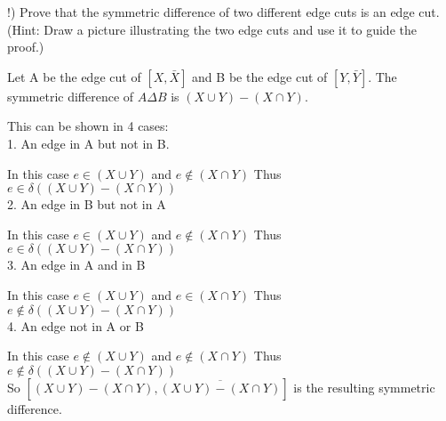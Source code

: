 \documentclass[12pt]{article}
\newenvironment{question}[2][Question]{\begin{trivlist}
\item[\hskip \labelsep {\bfseries #1}\hskip \labelsep {\bfseries #2.}]}{\end{trivlist}}
\begin{document}
\begin{question}{3}

($!$) Prove that the symmetric difference of two different edge cuts is an edge cut. (Hint: Draw a picture illustrating the two edge cuts and use it to guide the proof.)

Let A be the edge cut of  $[X,\bar{X}]$ and B be the edge cut of $[Y,\bar{Y}]$. The symmetric difference of $A \Delta B$ is $(X \cup Y) - (X \cap Y)$. 

This can be shown in 4 cases: \\
1. An edge in A but not in B.

	In this case $e \in (X \cup Y)$ and $e \notin (X \cap Y)$ Thus $e \in \delta((X \cup Y) - (X \cap Y))$\\	
2. An edge in B but not in A

	In this case $e \in (X \cup Y)$ and $e \notin (X \cap Y)$ Thus $e \in \delta((X \cup Y) - (X \cap Y))$\\	
3. An edge in A and in B

	In this case $e \in (X \cup Y)$ and $e \in (X \cap Y)$ Thus $e \notin \delta((X \cup Y) - (X \cap Y))$\\	
4. An edge not in A or B

	In this case $e \notin (X \cup Y)$ and $e \notin (X \cap Y)$ Thus $e \notin \delta((X \cup Y) - (X \cap Y))$\\	
	
So $[(X \cup Y) - (X \cap Y), \overline{(X \cup Y) - (X \cap Y)}]$ is the resulting symmetric difference.

	
\end{question}
\end{document}
